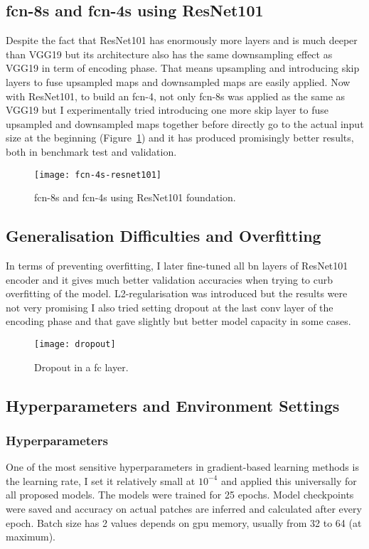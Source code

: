 \subsection{\acrshort{fcn}-8s and \acrshort{fcn}-4s using ResNet101}
Despite the fact that ResNet101 has enormously more layers and is much deeper
than VGG19 but its architecture also has the same downsampling effect as VGG19
in term of encoding phase. That means upsampling and introducing skip layers to
fuse upsampled maps and downsampled maps are easily applied. Now with ResNet101,
to build an \acrshort{fcn}-4, not only \acrshort{fcn}-8s was applied as the
same as VGG19 but I experimentally tried introducing one more skip layer to fuse
upsampled and downsampled maps together before directly go to the actual input
size at the beginning (Figure~\ref{fig:fcn-4s-resnet101}) and it has produced
promisingly better results, both in benchmark test and validation.
\begin{figure}[h]
    \centering
    \texttt{[image: fcn-4s-resnet101]}
    \caption{\acrshort{fcn}-8s and \acrshort{fcn}-4s using ResNet101
    foundation.}
    \label{fig:fcn-4s-resnet101}
\end{figure}

\subsection{Generalisation Difficulties and Overfitting}
In terms of preventing overfitting, I later fine-tuned all \acrshort{bn} layers
of ResNet101 encoder and it gives much better validation accuracies when trying
to curb overfitting of the model. L2-regularisation was introduced but the
results were not very promising I also tried setting dropout at the last
\acrshort{conv} layer of the encoding phase and that gave slightly but
better model capacity in some cases.
\begin{figure}[h]
    \centering
    \texttt{[image: dropout]}
    \caption{Dropout in a \acrshort{fc} layer.}
    \label{fig:dropout}
\end{figure}


\subsection{Hyperparameters and Environment Settings}
\subsubsection{Hyperparameters}
One of the most sensitive hyperparameters in gradient-based learning methods is
the learning rate, I set it relatively small at $10^{-4}$ and applied this
universally for all proposed models. The models were trained for 25 epochs.
Model checkpoints were saved and accuracy on actual patches are inferred and
calculated after every epoch. Batch size has 2 values depends on \acrshort{gpu}
memory, usually from 32 to 64 (at maximum).



